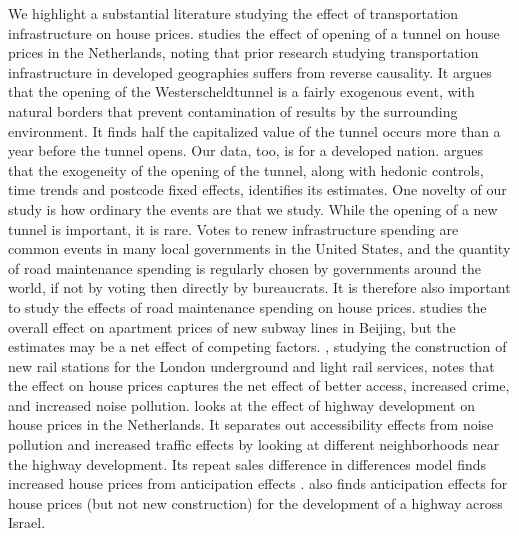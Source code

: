 We highlight a substantial literature studying the effect of transportation infrastructure on house prices. \cite{hoogendoorn2019house} studies the effect of opening of a tunnel on house prices in the Netherlands, noting that prior research studying transportation infrastructure in developed geographies suffers from reverse causality.  It argues that the opening of the Westerscheldtunnel is a fairly exogenous event, with natural borders that prevent contamination of results by the surrounding environment.  It finds half the capitalized value of the tunnel occurs more than a year before the tunnel opens.  Our data, too, is for a developed nation. \cite{hoogendoorn2019house} argues that the exogeneity of the opening of the tunnel, along with hedonic controls, time trends and postcode fixed effects, identifies its estimates.  One novelty of our study is how ordinary the events are that we study.  While the opening of a new tunnel is important, it is rare.  Votes to renew infrastructure spending are common events in many local governments in the United States, and the quantity of road maintenance spending is regularly chosen by governments around the world, if not by voting then directly by bureaucrats.  It is therefore also important to study the effects of road maintenance spending on house prices. \cite{li2016wheels} studies the overall effect on apartment prices of new subway lines in Beijing, but the estimates may be a net effect of competing factors. \cite{gibbons2005valuing}, studying the construction of new rail stations for the London underground and light rail services, notes that the effect on house prices captures the net effect of better access, increased crime, and increased noise pollution. \cite{levkovich2016effects} looks at the effect of highway development on house prices in the Netherlands.  It separates out accessibility effects from noise pollution and increased traffic effects by looking at different neighborhoods near the highway development.  Its repeat sales difference in differences model finds increased house prices from anticipation effects \citep{kohlhase1991impact}. \cite{beenstock2016hedonic} also finds anticipation effects for house prices (but not new construction) for the development of a highway across Israel. 

